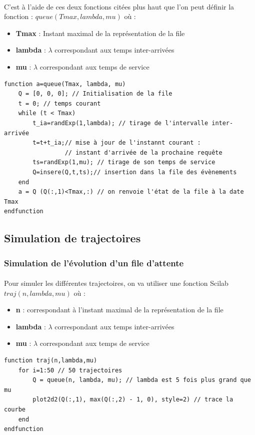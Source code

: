 \documentclass{article}
\begin{document}
\paragraph{}
C'est à l'aide de ces deux fonctions citées plus haut que l'on peut définir la fonction : $queue(Tmax, lambda, mu)$ où :
\begin{itemize}
	\item \textbf{Tmax} : Instant maximal de la représentation de la file
	\item \textbf{lambda} : $\lambda$ correspondant aux temps inter-arrivées
	\item \textbf{mu} :  $\lambda$ correspondant aux temps de service
\end{itemize}
\begin{verbatim}
function a=queue(Tmax, lambda, mu)
    Q = [0, 0, 0]; // Initialisation de la file
    t = 0; // temps courant
    while (t < Tmax)
        t_ia=randExp(1,lambda); // tirage de l'intervalle inter-arrivée
        t=t+t_ia;// mise à jour de l'instannt courant : 
                 // instant d'arrivée de la prochaine requête
        ts=randExp(1,mu); // tirage de son temps de service
        Q=insere(Q,t,ts);// insertion dans la file des évènements
    end
    a = Q (Q(:,1)<Tmax,:) // on renvoie l'état de la file à la date Tmax
endfunction
\end{verbatim}

\subsection{Simulation de trajectoires}

\subsubsection{Simulation de l'évolution d'un file d'attente}
\paragraph{}
Pour simuler les différentes trajectoires, on va utiliser une fonction Scilab $traj(n,lambda,mu)$ où :
\begin{itemize}
	\item \textbf{n} : correspondant à l'instant maximal de la représentation de la file
	\item \textbf{lambda} : $\lambda$ correspondant aux temps inter-arrivées
	\item \textbf{mu} :  $\lambda$ correspondant aux temps de service
\end{itemize}
\begin{verbatim}
function traj(n,lambda,mu)
    for i=1:50 // 50 trajectoires
        Q = queue(n, lambda, mu); // lambda est 5 fois plus grand que mu
        plot2d2(Q(:,1), max(Q(:,2) - 1, 0), style=2) // trace la courbe
    end
endfunction
\end{verbatim}
\end{document}
